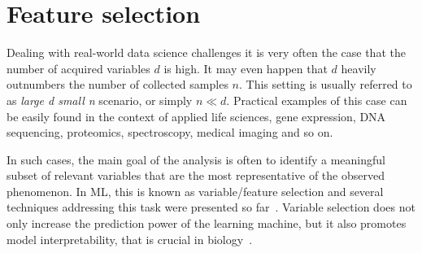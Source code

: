   \section{Feature selection} \label{subsec:feature_selection}
  
%  
	Dealing with real-world data science challenges it is very often the case that the number of acquired variables $d$ is high. It may even happen that $d$ heavily outnumbers the number of collected samples $n$. This setting is usually referred to as \textit{large d small n} scenario, or simply $n \ll d$. Practical examples of this case can be easily found in the context of applied life sciences, \eg gene expression, DNA sequencing, proteomics, spectroscopy, medical imaging and so on.
	
	In such cases, the main goal of the analysis is often to identify a meaningful subset of relevant variables that are the most representative of the observed phenomenon. In ML, this is known as variable/feature selection and several techniques addressing this task were presented so far~\cite{guyon2002gene}. Variable selection does not only increase the prediction power of the learning machine, but it also promotes model interpretability, that is crucial in biology~\cite{altmann2010permutation}.

